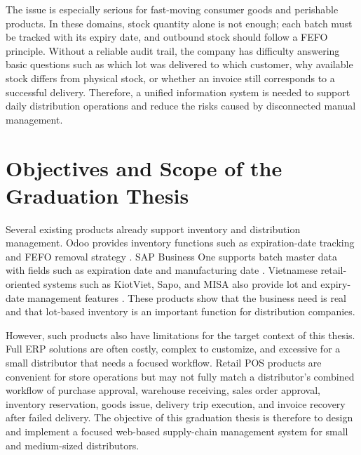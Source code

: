 The issue is especially serious for fast-moving consumer goods and perishable
products. In these domains, stock quantity alone is not enough; each batch must
be tracked with its expiry date, and outbound stock should follow a FEFO
principle. Without a reliable audit trail, the company has difficulty answering
basic questions such as which lot was delivered to which customer, why available
stock differs from physical stock, or whether an invoice still corresponds to a
successful delivery. Therefore, a unified information system is needed to support
daily distribution operations and reduce the risks caused by disconnected
manual management.

\section{Objectives and Scope of the Graduation Thesis}
Several existing products already support inventory and distribution
management. Odoo provides inventory functions such as expiration-date tracking
and FEFO removal strategy \cite{odooExpiration,odooFefo}. SAP Business One
supports batch master data with fields such as expiration date and manufacturing
date \cite{sapBatch}. Vietnamese retail-oriented systems such as KiotViet,
Sapo, and MISA also provide lot and expiry-date management features
\cite{kiotvietLotExpiry,sapoLotExpiry,misaLotExpiry}. These products show that
the business need is real and that lot-based inventory is an important function
for distribution companies.

However, such products also have limitations for the target context of this
thesis. Full ERP solutions are often costly, complex to customize, and excessive
for a small distributor that needs a focused workflow. Retail POS products are
convenient for store operations but may not fully match a distributor's combined
workflow of purchase approval, warehouse receiving, sales order approval,
inventory reservation, goods issue, delivery trip execution, and invoice
recovery after failed delivery. The objective of this graduation thesis is
therefore to design and implement a focused web-based supply-chain management
system for small and medium-sized distributors.

